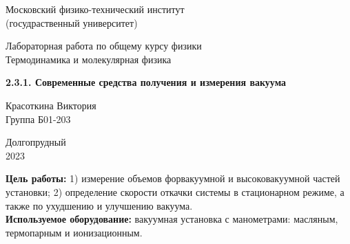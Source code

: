 \documentclass[a4paper, 12pt]{article} %
\begin{document}


\begin{titlepage}

	\newpage
	\begin{center}
		\normalsize Московский физико-технический институт \\(госудраственный университет)
	\end{center}

	\vspace{6em}

	\begin{center}
		\Large Лабораторная работа по общему курсу физики\\Термодинамика и молекулярная физика
	\end{center}

	\vspace{1em}

	\begin{center}
		\Large \textbf{2.3.1. Современные средства
получения и измерения вакуума}
	\end{center}

	\vspace{2em}

	\begin{center}
		\large Красоткина Виктория\\
		Группа Б01-203
	\end{center}

	\vspace{\fill}

	\begin{center}
		Долгопрудный \\2023
	\end{center}
	
\end{titlepage}



	\thispagestyle{empty}
	\newpage
	\tableofcontents
	\newpage
	\setcounter{page}{1}



\textbf{Цель работы:} 1) измерение объемов форвакуумной и высоковакуумной частей установки; 2) определение скорости откачки системы в стационарном режиме, а также по ухудшению и улучшению вакуума.\\

\textbf{Используемое оборудование:} вакуумная установка с манометрами: масляным, термопарным и ионизационным.
\end{document}
